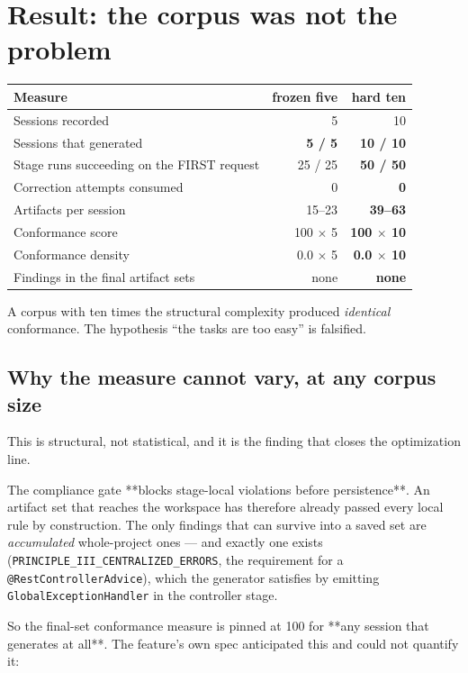 \documentclass[11pt,a4paper]{article}
\begin{document}
\section{Result: the corpus was not the problem}

\begin{center}
\begin{tabular}{@{}lrr@{}}
\toprule
\textbf{Measure} & \textbf{frozen five} & \textbf{hard ten} \\
\midrule
Sessions recorded & 5 & 10 \\
Sessions that generated & \textbf{5 / 5} & \textbf{10 / 10} \\
Stage runs succeeding on the FIRST request & 25 / 25 & \textbf{50 / 50} \\
Correction attempts consumed & 0 & \textbf{0} \\
Artifacts per session & 15--23 & \textbf{39--63} \\
Conformance score & 100 $\times$ 5 & \textbf{100 $\times$ 10} \\
Conformance density & 0.0 $\times$ 5 & \textbf{0.0 $\times$ 10} \\
Findings in the final artifact sets & none & \textbf{none} \\
\bottomrule
\end{tabular}
\end{center}

A corpus with ten times the structural complexity produced \emph{identical}
conformance. The hypothesis ``the tasks are too easy'' is falsified.

\subsection{Why the measure cannot vary, at any corpus size}
\label{sec:structural}

This is structural, not statistical, and it is the finding that closes the
optimization line.

The compliance gate **blocks stage-local violations before persistence**. An artifact
set that reaches the workspace has therefore already passed every local rule by
construction. The only findings that can survive into a saved set are
\emph{accumulated} whole-project ones --- and exactly one exists
(\texttt{PRINCIPLE\_III\_CENTRALIZED\_ERRORS}, the requirement for a
\texttt{@RestControllerAdvice}), which the generator satisfies by emitting
\texttt{GlobalExceptionHandler} in the controller stage.

So the final-set conformance measure is pinned at 100 for **any session that
generates at all**. The feature's own spec anticipated this and could not quantify
it:
\end{document}
